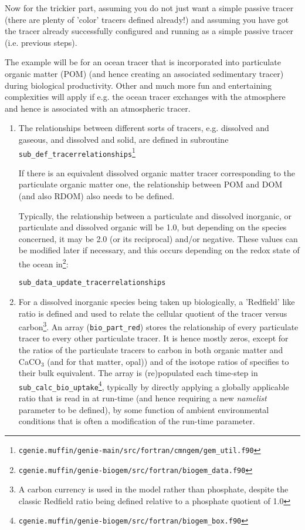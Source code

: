 \documentclass[11pt,fleqn]{book} %
\begin{document}
Now for the trickier part, assuming you do not just want a simple passive tracer (there are plenty of 'color' tracers defined already!) and assuming you have got the tracer already successfully configured and running as a simple passive tracer (i.e. previous steps).

\indent The example will be for an ocean tracer that is incorporated into particulate organic matter (POM) (and hence creating an associated sedimentary tracer) during biological productivity.
Other and much more fun and entertaining complexities will apply if e.g. the ocean tracer exchanges with the atmosphere and hence is associated with an atmospheric tracer.
\begin{enumerate}
\item
The relationships between different sorts of tracers, e.g. dissolved and gaseous, and dissolved and solid, are defined in subroutine \texttt{sub\_def\_tracerrelationships}\footnote{\texttt{cgenie.muffin/genie-main/src/fortran/cmngem/gem\_util.f90}}

If there is an equivalent dissolved organic matter tracer corresponding to the particulate organic matter one, the relationship between POM and DOM (and also RDOM) also needs to be defined.

Typically, the relationship between a particulate and dissolved inorganic, or particulate and dissolved organic will be 1.0, but depending on the species concerned, it may be 2.0 (or its reciprocal) and/or negative. These values can be modified later if necessary, and this occurs depending on the redox state of the ocean in\footnote{\texttt{cgenie.muffin/genie-biogem/src/fortran/biogem\_data.f90}}:
\vspace{-1mm}\small\begin{verbatim}
sub_data_update_tracerrelationships
\end{verbatim}\vspace{-1mm}\normalsize

\item
For a dissolved inorganic species being taken up biologically, a 'Redfield' like ratio is defined and used to relate the cellular quotient of the tracer versus carbon\footnote{A carbon currency is used in the model rather than phosphate, despite the classic Redfield ratio being defined relative to a phosphate quotient of 1.0}. An array (\texttt{bio\_part\_red}) stores the relationship of every particulate tracer to every other particulate tracer. It is hence mostly zeros, except for the ratios of the particulate tracers to carbon in both organic matter and CaCO\(_{3}\) (and for that matter, opal)) and of the isotope ratios of specifies to their bulk equivalent. The array is (re)populated each time-step in \texttt{sub\_calc\_bio\_uptake}\footnote{\texttt{cgenie.muffin/genie-biogem/src/fortran/biogem\_box.f90}},  typically by directly applying a  globally applicable ratio that is read in at run-time (and hence requiring a new \textit{namelist} parameter to be defined), by some function of ambient environmental conditions that  is often a modification of the run-time parameter.

\end{enumerate}
\end{document}
